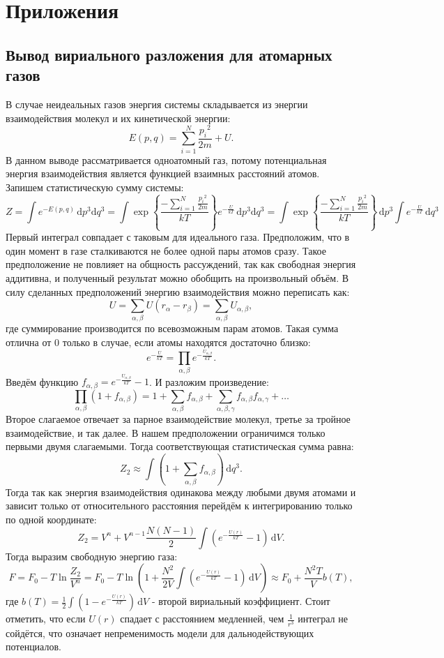 \documentclass[12pt]{article}
\begin{document}
\section{Приложения}
\subsection*{Вывод вириального разложения для атомарных газов} \label{app:1}
В случае неидеальных газов энергия системы складывается из энергии взаимодействия молекул и их кинетической энергии: 
\[
    E(p, q) = \sum_{i=1}^{N} \frac{{p_i}^2}{2m} + U.
\]
В данном выводе рассматривается одноатомный газ, потому потенциальная энергия взаимодействия является функцией взаимных расстояний атомов. 
Запишем статистическую сумму системы: 
\[
    Z = \int e^{-E(p, q)} \,\mathrm{d}p^3\mathrm{d}q^3 = 
    \int \exp {\left\{ \frac{-\sum_{i=1}^{N} \frac{{p_i}^2}{2m}}{kT} \right\} }  e^{-\frac{U}{kT}} \,\mathrm{d}p^3\mathrm{d}q^3 = 
    \int \exp {\left\{ \frac{-\sum_{i=1}^{N} \frac{{p_i}^2}{2m}}{kT} \right\} }  \,\mathrm{d}p^3 \int e^{-\frac{U}{kT}} \,\mathrm{d}q^3
\]
Первый интеграл совпадает с таковым для идеального газа. Предположим, что в один момент в газе сталкиваются не более одной пары атомов сразу.
Такое предположение не повлияет на общность рассуждений, так как свободная энергия аддитивна, и полученный 
результат можно обобщить на произвольный объём. В силу сделанных предположений энергию взаимодействия можно переписать как: 
\[
    U = \sum_{\alpha, \beta} U(r_\alpha - r_\beta) = \sum_{\alpha, \beta} U_{\alpha, \beta},   
\]
где суммирование производится по всевозможным парам атомов. 
Такая сумма отлична от 0 только в случае, если атомы находятся достаточно близко: 
\[
    e^{-\frac{U}{kT}} = \prod_{\alpha, \beta} e^{-\frac{U_{\alpha, \beta}}{kT}}.
\]
Введём функцию $f_{\alpha, \beta} = e^{-\frac{U_{\alpha, \beta}}{kT}} - 1$. И разложим произведение: 
\[
    \prod_{\alpha, \beta} \left( 1 + f_{\alpha, \beta} \right) = 1 + \sum_{\alpha, \beta} f_{\alpha, \beta} + \sum_{\alpha, \beta, \gamma} f_{\alpha, \beta} f_{\alpha, \gamma} + \dots   
\] 
Второе слагаемое отвечает за парное взаимодействие молекул, третье за тройное взаимодействие, и так далее. В нашем предположении 
ограничимся только первыми двумя слагаемыми. Тогда соответствующая статистическая сумма равна: 
\[
    Z_2 \approx \int \left( 1 + \sum_{\alpha, \beta} f_{\alpha, \beta} \right) \, \mathrm{d}q^3.
\]
Тогда так как энергия взаимодействия одинакова между любыми двумя атомами и зависит только от относительного расстояния перейдём к интегрированию только по одной координате: 
\[
    Z_2 = V^n + V^{n-1} \frac{N(N - 1)}{2} \int \left( e^{-\frac{U(r)}{kT}} - 1 \right) \,\mathrm{d}V.
\]
Тогда выразим свободную энергию газа: 
\[
    F = F_0 - T \ln \frac{Z_2}{V^n} = F_0 - T \ln \left( 1 + \frac{N^2}{2V} \int \left( e^{-\frac{U(r)}{kT}} - 1 \right) \,\mathrm{d}V \right) \approx 
    F_0 + \frac{N^2T}{V} b(T),  
\]
где $b(T) = \frac{1}{2} \int \left( 1 - e^{-\frac{U(r)}{kT}} \right) \,\mathrm{d}V$ - второй вириальный коэффициент.
Стоит отметить, что если $U(r)$ спадает с расстоянием медленней, чем $\frac{1}{r^3}$ интеграл не сойдётся, что означает 
непременимость модели для дальнодействующих потенциалов. 
\end{document}
